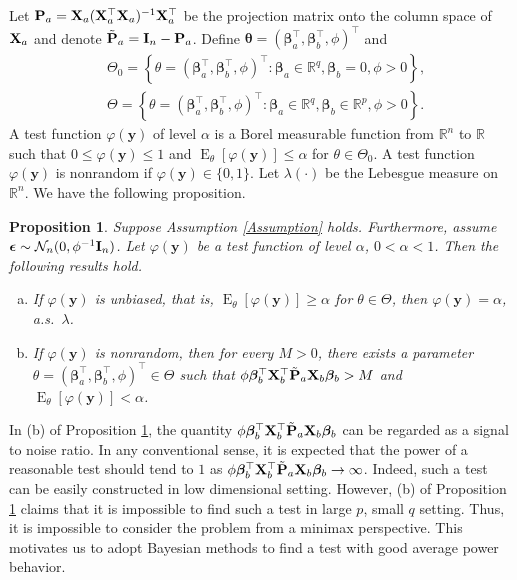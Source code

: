 \documentclass[11pt]{article}
\DeclareMathOperator{\myE}{E}
\newcommand{\By}{\mathbf{y}}    \newcommand{\Bz}{\mathbf{z}}
\newcommand{\bfsym}[1]{\ensuremath{\boldsymbol{#1}}}
\def\bbeta{\bfsym \beta}
\def\btheta{\bfsym {\theta}}           \def\bTheta {\bfsym {\Theta}}
\theoremstyle{plain}
\newtheorem{proposition}{\quad\quad Proposition}
\theoremstyle{definition}
\theoremstyle{remark}
\begin{document}
Let $\mathbf{P}_a=\mathbf{X}_a(\mathbf{X}_a^\top \mathbf{X}_a)^{-1} \mathbf{X}_a^\top$ be the projection matrix onto the column space of $\mathbf{X}_a$ and denote $\tilde {\mathbf{P}}_a = \mathbf{I}_n-\mathbf{P}_a$.
Define $\btheta =(\bbeta_a^\top , \bbeta_b^\top , \phi)^\top$ and 
\begin{equation*}
    \begin{split}
        &\Theta_0 = \left\{\theta=(\bbeta_a^\top , \bbeta_b^\top , \phi)^\top: \bbeta_a \in \mathbb R^{q}, \bbeta_b=0, \phi>0\right\},
    \\
    &\Theta = \left\{\theta=(\bbeta_a^\top , \bbeta_b^\top , \phi)^\top: \bbeta_a \in \mathbb R^{q}, \bbeta_b\in \mathbb R^p, \phi>0\right\}.
    \end{split}
\end{equation*}
A test function $\varphi(\By)$ of level $\alpha$ is a Borel measurable function from $\mathbb R^n$ to $\mathbb R$ such that $0\leq \varphi(\By) \leq 1$ and $\myE_\theta [\varphi(\By)]\leq \alpha$ for $\theta\in \Theta_0$.
A test function $\varphi(\By)$ is nonrandom if $\varphi(\By)\in\{0,1\}$.
Let $\lambda(\cdot)$ be the Lebesgue measure on $\mathbb R^n$.
We have the following proposition.
\begin{proposition}\label{prop:unbiased}
    Suppose Assumption \ref{Assumption} holds.
    Furthermore, assume $\bepsilon\sim \mathcal N_n (0, \phi^{-1}\BI_n)$.
    Let $\varphi(\By)$ be a test function of level $\alpha$, $0 <\alpha <1$.
Then the following results hold.
\begin{enumerate}[(a)]
    \item 
        If $\varphi(\By)$ is unbiased, that is, $\myE_\theta [\varphi(\By)]\geq \alpha$ for $\theta \in \Theta$, then $\varphi(\By)=\alpha$, a.s.\ $\lambda$.
\item
    If $\varphi(\By)$ is nonrandom, then for every $M>0$, there exists a parameter $\theta=(\bbeta_a^\top,\bbeta_b^\top,\phi)^\top \in \Theta$ such that $\phi\bbeta_b^\top \BX_b^\top \tilde \BP_a \BX_b \bbeta_b > M$ and $\myE_\theta [\varphi(\By)]< \alpha$.
\end{enumerate}
\end{proposition}
In (b) of Proposition \ref{prop:unbiased}, the quantity $\phi \bbeta_b^\top \BX_b^\top \tilde \BP_a \BX_b \bbeta_b$ can be regarded as a signal to noise ratio.
In any conventional sense, it is expected that the power of a reasonable test should tend to $1$ as $\phi \bbeta_b^\top \BX_b^\top \tilde \BP_a \BX_b \bbeta_b \to \infty$.
Indeed, such a test can be easily constructed in low dimensional setting.
However, (b) of Proposition \ref{prop:unbiased} claims that it is impossible to find such a test in large $p$, small $q$ setting.
Thus, it is impossible to consider the problem from a minimax perspective.
This motivates us 
to adopt Bayesian methods
to find a test with good average power behavior.
\end{document}
